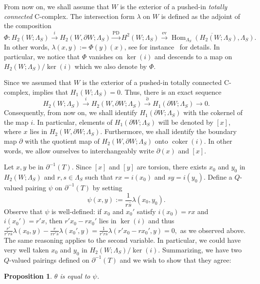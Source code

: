 \documentclass[11pt,a4paper]{amsart}
\newtheorem{proposition}[theorem]{Proposition}
\theoremstyle{definition}
\DeclareMathOperator{\coker}{coker}
\def\op{\operatorname}
\begin{document}
\medskip
From now on, we shall assume that $W$ is the exterior of a pushed-in \emph{totally connected} C-complex. The intersection form $\lambda$ on $W$ is defined as the adjoint of the composition
\begin{equation}
\label{eq:DefIntersection}
\Phi \colon H_2(W;\Lambda_S) \stackrel{i}{\to} H_2(W,\partial W;\Lambda_S) \stackrel{\text{PD}}{\rightarrow} H^2(W;\Lambda_S) \stackrel{\text{ev}}{\rightarrow} \overline{\op{Hom}_{\Lambda_S}(H_2(W;\Lambda_S),\Lambda_S)}.
\end{equation}
In other words, $\lambda(x,y):=\Phi(y)(x)$, see for instance~\cite[Section 2.3]{ConwayFriedlToffoli} for details. In particular, we notice that $\Phi$ vanishes on $\ker(i)$ and descends to a map on $H_2(W;\Lambda_S)/\ker(i)$ which we also denote by $\Phi$.

Since we assumed that $W$ is the exterior of a pushed-in totally connected C-complex, \cite[Corollary 3.2]{ConwayFriedlToffoli} implies that $H_1(W;\Lambda_S)=0$. Thus, there is an exact sequence 
$$H_2(W;\Lambda_S) \stackrel{i}{\to} H_2(W,\partial W;\Lambda_S) \stackrel{\partial}{\to} H_1(\partial W;\Lambda_S) \to 0.$$
Consequently, from now on, we shall identify $H_1(\partial W;\Lambda_S)$ with the cokernel of the map $i$. In particular, elements of $H_1(\partial W;\Lambda_S)$ will be denoted by $[x]$, where $x$ lies in $H_2(W,\partial W;\Lambda_S)$. Furthermore, we shall identify the boundary map $\partial$ with the quotient map of $H_2(W,\partial W ; \Lambda_S)$ onto $\coker(i)$. In other words, we allow ourselves to interchangeably write $\partial (x)$ and $[x]$. 

Let $x,y$ be in $\partial^{-1}(T)$. Since $[x]$ and $[y]$ are torsion, there exists $x_0$ and $y_0$ in $H_2(W;\Lambda_S)$ and $r,s \in \Lambda_S$ such that $r x=i(x_0)$ and $s y =i(y_0)$. 
Define a $Q$-valued pairing $\psi$ on $\partial^{-1}(T)$ by setting
$$\psi(x,y) := \frac{1}{r\overline{s}}\lambda(x_0,y_0).$$
Observe that $\psi$ is well-defined: if $x_0$ and $x_0'$ satisfy $i(x_0)=r x$ and $i(x_0')=r'x$, then $r'x_0-rx_0'$ lies in $\ker(i)$ and thus 
$\frac{r'}{r'r\overline{s}}\lambda(x_0,y)-\frac{r}{rr'\overline{s}}\lambda(x_0',y)=\frac{1}{r'r\overline{s}}\lambda(r'x_0-rx_0',y)=0,$
as we observed above. 
The same reasoning applies to the second variable. In particular, we could have very well taken $x_0$ and $y_0$ in $H_2(W;\Lambda_S)/\ker(i)$. Summarizing, we have two $Q$-valued pairings defined on $\partial^{-1}(T)$ and we wish to show that they agree:

\begin{proposition}
\label{prop:ComputeTheta}
$\theta$ is equal to $\psi$.
\end{proposition}
\end{document}

